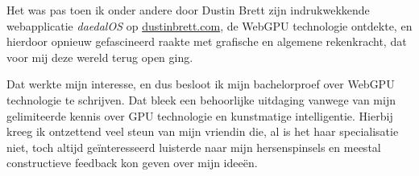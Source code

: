 \bigbreak{}

Het was pas toen ik onder andere door Dustin Brett zijn indrukwekkende webapplicatie \textit{daedalOS} op \href{https://dustinbrett.com/}{dustinbrett.com}, de WebGPU technologie ontdekte, en hierdoor opnieuw gefascineerd raakte met grafische en algemene rekenkracht, dat voor mij deze wereld terug open ging.

\bigbreak{}

Dat werkte mijn interesse, en dus besloot ik mijn bachelorproef over WebGPU technologie te schrijven. Dat bleek een behoorlijke uitdaging vanwege van mijn gelimiteerde kennis over GPU technologie en kunstmatige intelligentie. Hierbij kreeg ik ontzettend veel steun van mijn vriendin die, al is het haar specialisatie niet, toch altijd geïnteresseerd luisterde naar mijn hersenspinsels en meestal constructieve feedback kon geven over mijn ideeën.